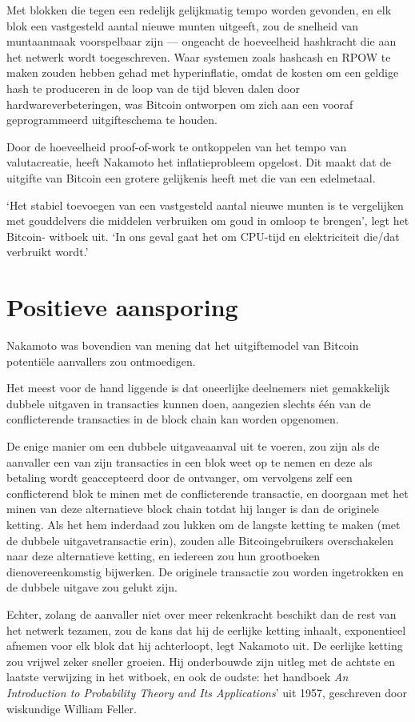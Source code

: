 \documentclass[
  a5paper,
  smalldemyvopaper,11pt,twoside,onecolumn,openright,extrafontsizes]{memoir}
\begin{document}
Met blokken die tegen een redelijk gelijkmatig tempo worden gevonden, en
elk blok een vastgesteld aantal nieuwe munten uitgeeft, zou de snelheid
van muntaanmaak voorspelbaar zijn --- ongeacht de hoeveelheid hashkracht
die aan het netwerk wordt toegeschreven. Waar systemen zoals hashcash en
RPOW te maken zouden hebben gehad met hyperinflatie, omdat de kosten om
een geldige hash te produceren in de loop van de tijd bleven dalen door
hardwareverbeteringen, was Bitcoin ontworpen om zich aan een vooraf
geprogrammeerd uitgifteschema te houden.

Door de hoeveelheid proof-of-work te ontkoppelen van het tempo van
valutacreatie, heeft Nakamoto het inflatieprobleem opgelost. Dit maakt
dat de uitgifte van Bitcoin een grotere gelijkenis heeft met die van een
edelmetaal.

`Het stabiel toevoegen van een vastgesteld aantal nieuwe munten is te
vergelijken met gouddelvers die middelen verbruiken om goud in omloop te
brengen', legt het Bitcoin- witboek uit. `In ons geval gaat het om
CPU-tijd en elektriciteit die/dat verbruikt wordt.'

\section{Positieve aansporing}\label{positieve-aansporing}

Nakamoto was bovendien van mening dat het uitgiftemodel van Bitcoin
potentiële aanvallers zou ontmoedigen.

Het meest voor de hand liggende is dat oneerlijke deelnemers niet
gemakkelijk dubbele uitgaven in transacties kunnen doen, aangezien
slechts één van de conflicterende transacties in de block chain kan
worden opgenomen.

De enige manier om een dubbele uitgaveaanval uit te voeren, zou zijn als
de aanvaller een van zijn transacties in een blok weet op te nemen en
deze als betaling wordt geaccepteerd door de ontvanger, om vervolgens
zelf een conflicterend blok te minen met de conflicterende transactie,
en doorgaan met het minen van deze alternatieve block chain totdat hij
langer is dan de originele ketting. Als het hem inderdaad zou lukken om
de langste ketting te maken (met de dubbele uitgavetransactie erin),
zouden alle Bitcoingebruikers overschakelen naar deze alternatieve
ketting, en iedereen zou hun grootboeken dienovereenkomstig bijwerken.
De originele transactie zou worden ingetrokken en de dubbele uitgave zou
gelukt zijn.

Echter, zolang de aanvaller niet over meer rekenkracht beschikt dan de
rest van het netwerk tezamen, zou de kans dat hij de eerlijke ketting
inhaalt, exponentieel afnemen voor elk blok dat hij achterloopt, legt
Nakamoto uit. De eerlijke ketting zou vrijwel zeker sneller groeien. Hij
onderbouwde zijn uitleg met de achtste en laatste verwijzing in het
witboek, en ook de oudste: het handboek \emph{An Introduction to
Probability Theory and Its Applications}' uit 1957, geschreven door
wiskundige William Feller.
\end{document}
